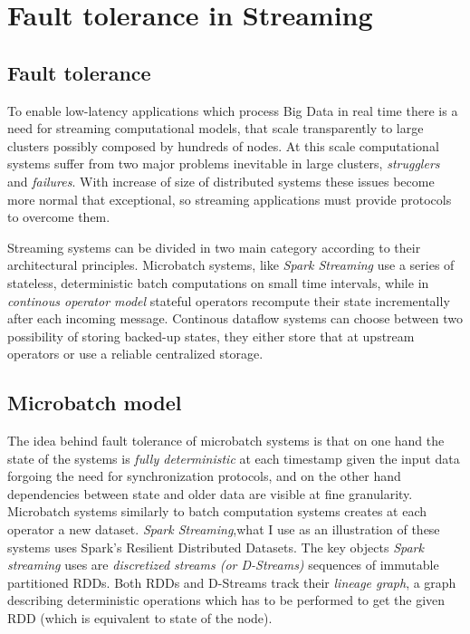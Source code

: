 \section{Fault tolerance in Streaming}


\subsection{Fault tolerance}
To enable low-latency applications which process Big Data in real time there is a need for streaming computational models, that scale transparently to large clusters possibly composed by hundreds of nodes. At this scale computational systems suffer from two major problems inevitable in large clusters, \textit{strugglers} and \textit{failures}. With increase of size of distributed systems these issues become more normal that exceptional, so streaming applications must provide protocols to overcome them.

Streaming systems can be divided in two main category according to their architectural principles. Microbatch systems, like \textit{Spark Streaming} \cite{discretizedstreams} use a series of stateless, deterministic batch computations on small time intervals, while in \textit{continous operator model} stateful operators recompute their state incrementally after each incoming message. Continous dataflow systems can choose between two possibility of storing backed-up states, they either store that at upstream operators\cite{mapreduceonline}\cite{storm} or use a reliable centralized storage\cite{millwheel}\cite{stratosphere}. 
\subsection{Microbatch model}


The idea behind fault tolerance of microbatch systems is that on one hand the state of the systems is \textit{fully deterministic} at each timestamp given the input data forgoing the need for synchronization protocols, and on the other hand dependencies between state and older data are visible at fine granularity. Microbatch systems similarly to batch computation systems creates at each operator a new dataset.  \textit{Spark Streaming},what I use as an illustration of these systems uses  Spark's Resilient Distributed Datasets\cite{rdd}. The key objects \textit{Spark streaming} uses are \textit{discretized streams (or D-Streams)} sequences of immutable partitioned RDDs. Both RDDs and D-Streams track their \textit{lineage graph}, a graph describing deterministic operations which has to be performed to get the given RDD (which is equivalent to state of the node).

